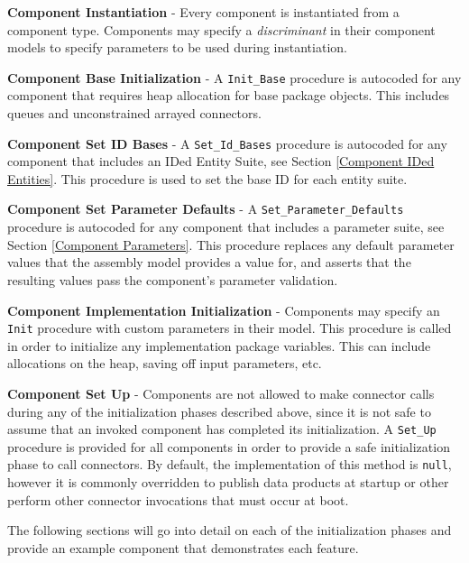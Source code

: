 \vspace{5mm} %
\begin{spacedenumerate}
  \item \textbf{Component Instantiation} - Every component is instantiated from a component type. Components may specify a \textit{discriminant} in their component models to specify parameters to be used during instantiation.
  \item \textbf{Component Base Initialization} - A \texttt{Init\_Base} procedure is autocoded for any component that requires heap allocation for base package objects. This includes queues and unconstrained arrayed connectors.
  \item \textbf{Component Set ID Bases} - A \texttt{Set\_Id\_Bases} procedure is autocoded for any component that includes an IDed Entity Suite, see Section \ref{Component IDed Entities}. This procedure is used to set the base ID for each entity suite.
  \item \textbf{Component Set Parameter Defaults} - A \texttt{Set\_Parameter\_Defaults} procedure is autocoded for any component that includes a parameter suite, see Section \ref{Component Parameters}. This procedure replaces any default parameter values that the assembly model provides a value for, and asserts that the resulting values pass the component's parameter validation.
  \item \textbf{Component Implementation Initialization} - Components may specify an \texttt{Init} procedure with custom parameters in their model. This procedure is called in order to initialize any implementation package variables. This can include allocations on the heap, saving off input parameters, etc.
  \item \textbf{Component Set Up} - Components are not allowed to make connector calls during any of the initialization phases described above, since it is not safe to assume that an invoked component has completed its initialization. A \texttt{Set\_Up} procedure is provided for all components in order to provide a safe initialization phase to call connectors. By default, the implementation of this method is \texttt{null}, however it is commonly overridden to publish data products at startup or other perform other connector invocations that must occur at boot.
\end{spacedenumerate}
\vspace{5mm} %

The following sections will go into detail on each of the initialization phases and provide an example component that demonstrates each feature.

